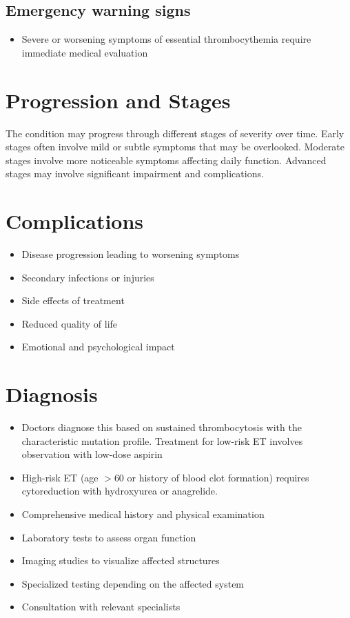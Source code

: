 \subsection{Emergency warning signs}
\begin{itemize}[noitemsep]
  \item Severe or worsening symptoms of essential thrombocythemia require immediate medical evaluation
\end{itemize}
\section{Progression and Stages}
The condition may progress through different stages of severity over time. Early stages often involve mild or subtle symptoms that may be overlooked. Moderate stages involve more noticeable symptoms affecting daily function. Advanced stages may involve significant impairment and complications.
\section{Complications}
\begin{itemize}[noitemsep]
  \item Disease progression leading to worsening symptoms
  \item Secondary infections or injuries
  \item Side effects of treatment
  \item Reduced quality of life
  \item Emotional and psychological impact
\end{itemize}
\section{Diagnosis}
\begin{itemize}[noitemsep]
  \item Doctors diagnose this based on sustained thrombocytosis with the characteristic mutation profile. Treatment for low-risk ET involves observation with low-dose aspirin
  \item High-risk ET (age $>$60 or history of blood clot formation) requires cytoreduction with hydroxyurea or anagrelide.
  \item Comprehensive medical history and physical examination
  \item Laboratory tests to assess organ function
  \item Imaging studies to visualize affected structures
  \item Specialized testing depending on the affected system
  \item Consultation with relevant specialists
\end{itemize}
